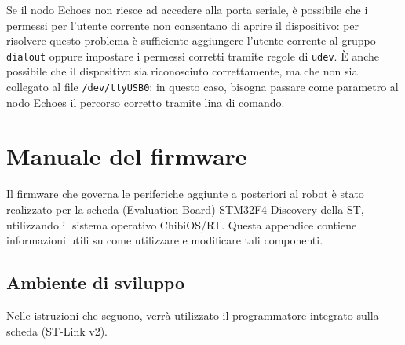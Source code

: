 \begin{nota}
Se il nodo Echoes non riesce ad accedere alla porta seriale, è possibile che i permessi per l'utente corrente non consentano di aprire il dispositivo: per risolvere questo problema è sufficiente aggiungere l'utente corrente al gruppo \verb|dialout| oppure impostare i permessi corretti tramite regole di \verb|udev|. È anche possibile che il dispositivo sia riconosciuto correttamente, ma che non sia collegato al file \verb|/dev/ttyUSB0|: in questo caso, bisogna passare come parametro al nodo Echoes il percorso corretto tramite lina di comando.
\end{nota}

\chapter{Manuale del firmware}

Il firmware che governa le periferiche aggiunte a posteriori al robot è stato realizzato per la scheda (Evaluation Board) STM32F4 Discovery della ST, utilizzando il sistema operativo ChibiOS/RT. Questa appendice contiene informazioni utili su come utilizzare e modificare tali componenti.

\section{Ambiente di sviluppo}
Nelle istruzioni che seguono, verrà utilizzato il programmatore integrato sulla scheda (ST-Link v2).

